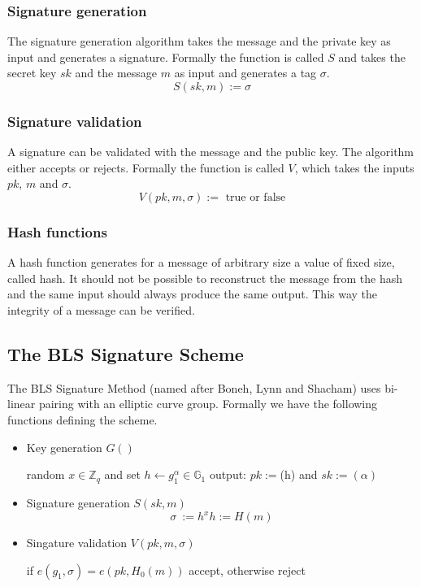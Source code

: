 \documentclass[a4paper,12pt]{scrartcl}
\begin{document}
\subsubsection{Signature generation}

The signature generation algorithm takes the message and the private key as input and generates a signature. Formally the function is called $S$ and takes the secret key $sk$ and the message $m$ as input and generates a tag $\sigma$.
\[
S(sk, m) := \sigma
\]

\subsubsection{Signature validation}

A signature can be validated with the message and the public key. The algorithm either accepts or rejects. Formally the function is called $V$, which takes the inputs $pk$, $m$ and $\sigma$.
\[
V(pk, m, \sigma) := \text{ true or false}
\]

\subsubsection{Hash functions}

A hash function generates for a message of arbitrary size a value of fixed size, called hash. It should not be possible to reconstruct the message from the hash and the same input should always produce the same output. This way the integrity of a message can be verified.

\subsection{The BLS Signature Scheme}
The BLS Signature Method (named after Boneh, Lynn and Shacham) uses bi-linear pairing with an elliptic curve group.
Formally we have the following functions defining the scheme.
\begin{itemize}
	\item Key generation $G()$
	\begin{center}
		random \( x\in \mathbb{Z}_{q} \) and set \( h \leftarrow g_{1}^\alpha\in \mathbb{G}_{1} \) output: \( pk := \)(h) and \( sk := (\alpha) \)
	\end{center}
	\item Signature generation $S(sk, m) $
	\[ \sigma\ := h^x  h := H(m) \]
	\item Singature validation $V(pk, m, \sigma)$
	\begin{center}
		if \( e(g_{1},\sigma) = e(pk, H_{0}(m)) \) accept, otherwise reject
	\end{center}
\end{itemize}
\end{document}

